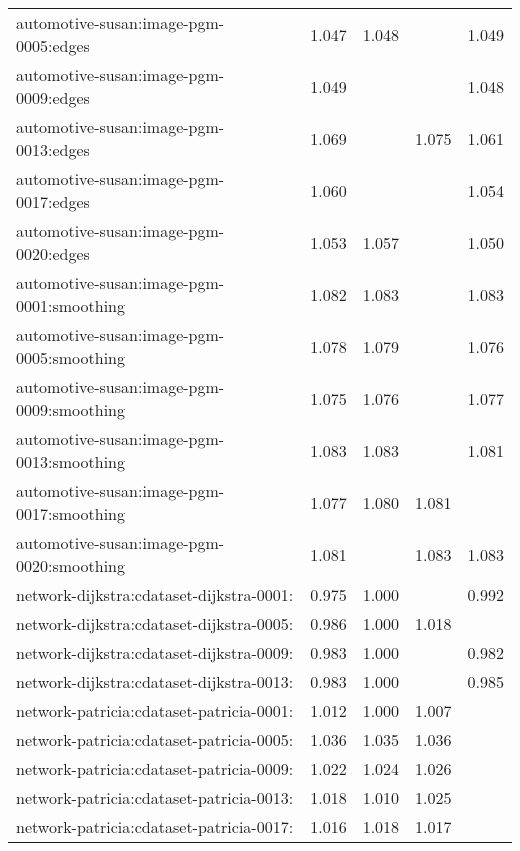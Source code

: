 \begin{longtable}{lrrrr}
automotive-susan:image-pgm-0005:edges & 1.047 & 1.048 & \color{Green}{1.050} & 1.049 \\
automotive-susan:image-pgm-0009:edges & 1.049 & \color{Green}{1.052} & \color{Green}{1.052} & 1.048 \\
automotive-susan:image-pgm-0013:edges & 1.069 & \color{Green}{1.077} & 1.075 & 1.061 \\
automotive-susan:image-pgm-0017:edges & 1.060 & \color{Green}{1.062} & \color{Green}{1.062} & 1.054 \\
automotive-susan:image-pgm-0020:edges & 1.053 & 1.057 & \color{Green}{1.059} & 1.050 \\
automotive-susan:image-pgm-0001:smoothing & 1.082 & 1.083 & \color{Green}{1.084} & 1.083 \\
automotive-susan:image-pgm-0005:smoothing & 1.078 & 1.079 & \color{Green}{1.080} & 1.076 \\
automotive-susan:image-pgm-0009:smoothing & 1.075 & 1.076 & \color{Green}{1.078} & 1.077 \\
automotive-susan:image-pgm-0013:smoothing & 1.083 & 1.083 & \color{Green}{1.085} & 1.081 \\
automotive-susan:image-pgm-0017:smoothing & 1.077 & 1.080 & 1.081 & \color{Green}{1.082} \\
automotive-susan:image-pgm-0020:smoothing & 1.081 & \color{Green}{1.085} & 1.083 & 1.083 \\
network-dijkstra:cdataset-dijkstra-0001: & 0.975 & 1.000 & \color{Green}{1.002} & 0.992 \\
network-dijkstra:cdataset-dijkstra-0005: & 0.986 & 1.000 & 1.018 & \color{Green}{1.022} \\
network-dijkstra:cdataset-dijkstra-0009: & 0.983 & 1.000 & \color{Green}{1.013} & 0.982 \\
network-dijkstra:cdataset-dijkstra-0013: & 0.983 & 1.000 & \color{Green}{1.010} & 0.985 \\
network-patricia:cdataset-patricia-0001: & 1.012 & 1.000 & 1.007 & \color{Green}{1.072} \\
network-patricia:cdataset-patricia-0005: & 1.036 & 1.035 & 1.036 & \color{Green}{1.078} \\
network-patricia:cdataset-patricia-0009: & 1.022 & 1.024 & 1.026 & \color{Green}{1.124} \\
network-patricia:cdataset-patricia-0013: & 1.018 & 1.010 & 1.025 & \color{Green}{1.115} \\
network-patricia:cdataset-patricia-0017: & 1.016 & 1.018 & 1.017 & \color{Green}{1.109} \\

\end{longtable}
